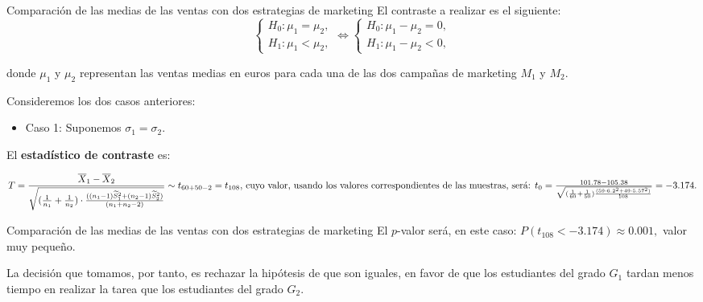 \documentclass[
  ignorenonframetext,
]{beamer}
\providecommand{\tightlist}{%
  \setlength{\itemsep}{0pt}\setlength{\parskip}{0pt}}
\begin{document}
\begin{frame}{Comparación de las medias de las ventas con dos
estrategias de marketing}
\protect\hypertarget{comparaciuxf3n-de-las-medias-de-las-ventas-con-dos-estrategias-de-marketing-2}{}
El contraste a realizar es el siguiente: \[
\left\{\begin{array}{l}
H_0:\mu_1=\mu_2,\\
H_1:\mu_1< \mu_2,
\end{array}\right.
\Longleftrightarrow
\left\{\begin{array}{l}
H_0:\mu_1-\mu_2=0,\\
H_1:\mu_1- \mu_2<0,
\end{array}\right.
\]

donde \(\mu_1\) y \(\mu_2\) representan las ventas medias en euros para
cada una de las dos campañas de marketing \(M_1\) y \(M_2\).

Consideremos los dos casos anteriores:

\begin{itemize}
\tightlist
\item
  Caso 1: Suponemos \(\sigma_1=\sigma_2\).
\end{itemize}

El \textbf{estadístico de contraste} es:

\[
T=\frac{\overline{X}_1-\overline{X}_2}
{\sqrt{(\frac1{n_1}+\frac1{n_2})\cdot 
\frac{((n_1-1)\widetilde{S}_1^2+(n_2-1)\widetilde{S}_2^2)}
{(n_1+n_2-2)}}}\sim t_{60+50-2}=t_{108},$
cuyo valor, usando los valores correspondientes de las muestras, será:
$t_0=\frac{101.78-105.38}{\sqrt{(\frac1{60}+\frac1{50})\frac{(59\cdot 6.2^2+49\cdot 5.57^2)}{108}}}=-3.174.
\]
\end{frame}

\begin{frame}{Comparación de las medias de las ventas con dos
estrategias de marketing}
\protect\hypertarget{comparaciuxf3n-de-las-medias-de-las-ventas-con-dos-estrategias-de-marketing-3}{}
El \(p\)-valor será, en este caso: \(P(t_{108}<-3.174)\approx 0.001,\)
valor muy pequeño.

La decisión que tomamos, por tanto, es rechazar la hipótesis de que son
iguales, en favor de que los estudiantes del grado \(G_1\) tardan menos
tiempo en realizar la tarea que los estudiantes del grado \(G_2\).
\end{frame}
\end{document}
